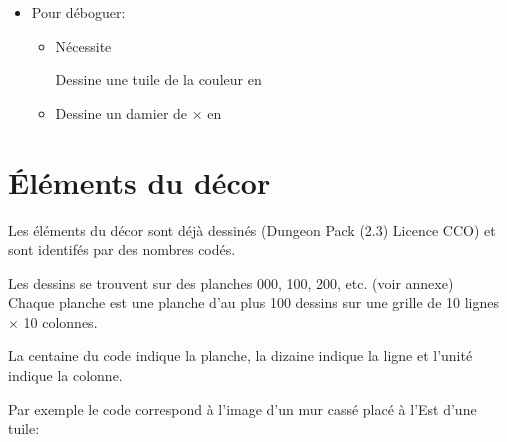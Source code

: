 \documentclass[11pt]{article}
\begin{document}
\begin{itemize}
\begin{itemize}
    Joue un son à partir de son identifiant (ex: "weapons/explosion") joue le son qui se trouve dans sounds/weapons/explosion.wav.

    \item {}
    
    Même chose, mais limite le son à millis ms.
        
    \item {}

    \end{itemize}

        \item Pour déboguer:

    \begin{itemize}
        \item {}

        Nécessite 

        Dessine une tuile de la couleur en 


        \item {}
        
        Dessine un damier de $\times$  en 

    \end{itemize}

\end{itemize}

\section*{Éléments du décor}

Les éléments du décor sont déjà dessinés (Dungeon Pack (2.3) Licence CCO) et sont identifés par des nombres codés.

Les dessins se trouvent sur des planches 000, 100, 200, etc. (voir annexe)\\

Chaque planche est une planche d'au plus 100 dessins sur une grille de 10 lignes $\times$ 10 colonnes. 

La centaine du code indique la planche, la dizaine indique la ligne et l'unité indique la colonne.

Par exemple le code  correspond à l'image d'un mur cassé placé à l'Est d'une tuile:
\end{document}
